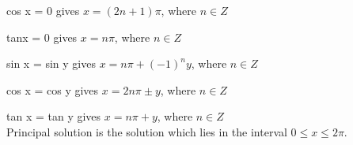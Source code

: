 \documentclass[12pt]{article}
\theoremstyle{colored}
\theoremstyle{subcolored}
\begin{document}
\begin{multicols}{2}
cos x = 0 gives $x = (2n + 1)\pi$, where $n \in Z$

tanx = 0 gives $x = n \pi$, where $n \in Z$

sin x = sin y  gives $x = n \pi + (-1)^n y$, where $n \in Z$

cos x = cos y gives $x = 2n\pi ± y$, where $n \in Z$

tan x = tan y gives $x = n\pi + y$, where $n \in Z$
\\
Principal solution is the solution which lies in the interval $0 \leq x \leq 2\pi$.
\end{multicols}
\end{document}
